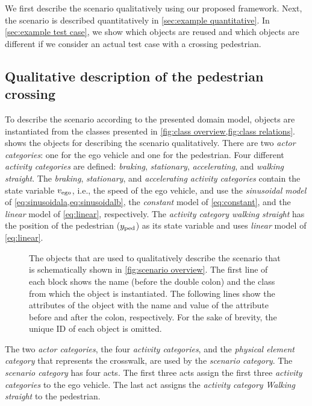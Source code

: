 We first describe the scenario qualitatively using our proposed \cstartb framework\cendb. Next, the scenario is described quantitatively in \cref{sec:example quantitative}. 
In \cref{sec:example test case}, we show \cstarte which objects are reused and which objects are different if we consider an actual test case with a crossing pedestrian. \cende



\subsection{Qualitative description of the pedestrian crossing}
\label{sec:example qualitative}

To describe the scenario according to the presented domain model, objects are instantiated from the classes presented in \cref{fig:class overview,fig:class relations}.  shows the objects for describing the scenario qualitatively. There are two \textit{actor categories}: one for the ego vehicle and one for the pedestrian. Four different \textit{activity categories} are defined: \textit{braking}, \textit{stationary}, \textit{accelerating}, and \emph{walking straight}. 
\cstarte The \textit{braking}, \textit{stationary}, and \textit{accelerating activity categories} contain the state variable $v_{\mathrm{ego}}$, i.e., the speed of the ego vehicle, and use the \textit{sinusoidal model} of \cref{eq:sinusoidala,eq:sinusoidalb}, the \textit{constant} model of \cref{eq:constant}, and the \textit{linear} model of \cref{eq:linear}, respectively. 
The \textit{activity category walking straight} has the position of the pedestrian ($y_{\mathrm{ped}}$) as its state variable and uses \textit{linear} model of \cref{eq:linear}. \cende 

\begin{figure*}[t]
	\centering
	
	\caption{The objects that are used to qualitatively describe the scenario that is schematically shown in \cref{fig:scenario overview}. The first line of each block shows the name (before the double colon) and the class from which the object is instantiated. The following lines show the attributes of the object with the name and value of the attribute before and after the colon, respectively. For the sake of brevity, the unique ID of each object is omitted.}
	\label{fig:example qualitative}
\end{figure*}


The two \textit{actor categories}, the four \textit{activity categories}, and the \cstartc\textit{physical element category} \cendc\cstartd that represents the crosswalk\cendd, are used by the \textit{scenario category}. The \textit{scenario category} has four acts. The first three acts assign the first three \textit{activity categories} to the ego vehicle. The last act assigns the \textit{activity category} \emph{Walking straight} to the pedestrian. 



